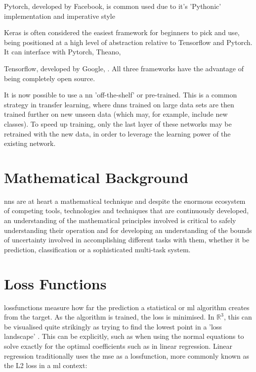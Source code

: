 Pytorch, developed by Facebook, is common used due to it's 'Pythonic' implementation and imperative style 


Keras is often considered the easiest framework for beginners to pick and use, being positioned at a high level of abstraction relative to Tensorflow and Pytorch. It can interface with Pytorch, Theano,  \bigskip

Tensorflow, developed by Google,  \cite{tale_dl}. All three frameworks have the advantage of being completely open source. \bigskip

It is now possible to use a  \gls{nn} 'off-the-shelf' or pre-trained. This is a common strategy in transfer learning, where \gls{dnn}s trained on large data sets are then trained further on new unseen data (which may, for example, include new classes). To speed up training, only the last layer of these networks may be retrained with the new data, in order to leverage the learning power of the existing network. \bigskip

\section*{Mathematical Background}


\gls{nn}s are at heart a mathematical technique and despite the enormous ecosystem of competing tools, technologies and techniques that are continuously developed, an understanding of the mathematical principles involved  is critical to safely understanding their operation and for developing an understanding of the bounds of uncertainty involved in accomplishing different tasks with them, whether it be prediction, classification or a sophisticated multi-task system.

\section{Loss Functions}

\gls{lossfunction}s measure how far the prediction a statistical or \gls{ml} algorithm creates from the target. As the algorithm is trained, the loss is minimised. In $\mathds{R}^3$, this can be visualised quite strikingly as trying to find the lowest point in a 'loss landscape' \cite{loss_landscape}. This can be explicitly, such as when using the normal equations to solve exactly for the optimal coefficients such as in linear regression. Linear regression traditionally uses the  \gls{mse} as a \gls{lossfunction}, more commonly known as the L2 loss in a \gls{ml} context:

